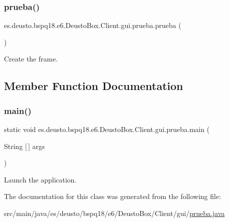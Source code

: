 \subsubsection{\texorpdfstring{prueba()}{prueba()}}
{\footnotesize\ttfamily es.\+deusto.\+bspq18.\+e6.\+Deusto\+Box.\+Client.\+gui.\+prueba.\+prueba (\begin{DoxyParamCaption}{ }\end{DoxyParamCaption})}

Create the frame. 

\subsection{Member Function Documentation}
\mbox{\label{classes_1_1deusto_1_1bspq18_1_1e6_1_1_deusto_box_1_1_client_1_1gui_1_1prueba_a35ce3684431b0cb30bed0468eeff815d}} 
\subsubsection{\texorpdfstring{main()}{main()}}
{\footnotesize\ttfamily static void es.\+deusto.\+bspq18.\+e6.\+Deusto\+Box.\+Client.\+gui.\+prueba.\+main (\begin{DoxyParamCaption}\item[{String \mbox{[}$\,$\mbox{]}}]{args }\end{DoxyParamCaption})\hspace{0.3cm}{\ttfamily [static]}}

Launch the application. 

The documentation for this class was generated from the following file\+:\begin{DoxyCompactItemize}
\item 
src/main/java/es/deusto/bspq18/e6/\+Deusto\+Box/\+Client/gui/\mbox{\hyperlink{prueba_8java}{prueba.\+java}}\end{DoxyCompactItemize}
